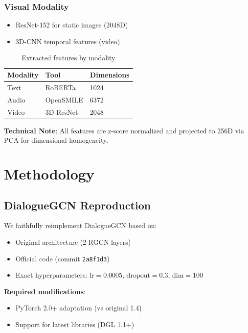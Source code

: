 \documentclass[a4paper,11pt]{article}
\begin{document}
\subsubsection{Visual Modality}
\begin{itemize}
    \item ResNet-152 for static images (2048D)
    \item 3D-CNN temporal features (video)
\end{itemize}

\begin{table}[h]
\centering
\begin{tabular}{lll}
\toprule
Modality & Tool & Dimensions \\
\midrule
Text & RoBERTa & 1024 \\
Audio & OpenSMILE & 6372 \\
Video & 3D-ResNet & 2048 \\
\bottomrule
\end{tabular}
\caption{Extracted features by modality}
\label{tab:features}
\end{table}

\textbf{Technical Note}: All features are z-score normalized and projected to 256D via PCA for dimensional homogeneity.

\section{Methodology}
\subsection{DialogueGCN Reproduction}
We faithfully reimplement DialogueGCN \cite{ghosal2019dialoguegcn} based on:

\begin{itemize}
    \item Original architecture (2 RGCN layers)
    \item Official code (commit \texttt{2a8f1d3})
    \item Exact hyperparameters: $\text{lr}=0.0005$, $\text{dropout}=0.3$, $\text{dim}=100$
\end{itemize}

\textbf{Required modifications}:
\begin{itemize}
    \item PyTorch 2.0+ adaptation (vs original 1.4)
    \item Support for latest libraries (DGL 1.1+)
\end{itemize}
\end{document}
